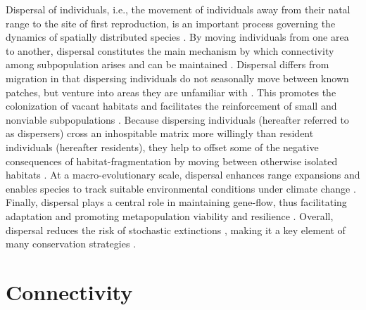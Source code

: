 \documentclass[../FinalThesis.tex]{subfiles}
\begin{document}
Dispersal of individuals, i.e., the movement of individuals away from their
natal range to the site of first reproduction, is an important process governing
the dynamics of spatially distributed species \citep{Howard.1960, Clobert.2012}.
By moving individuals from one area to another, dispersal constitutes the main
mechanism by which connectivity among subpopulation arises and can be maintained
\citep{Fahrig.2003}. Dispersal differs from migration in that dispersing
individuals do not seasonally move between known patches, but venture into areas
they are unfamiliar with \citep{Hundertmark.2007}. This promotes the
colonization of vacant habitats \citep{Gustafson.1996, Hanski.1999,
MacArthur.2001} and facilitates the reinforcement of small and nonviable
subpopulations \citep{Brown.1977}. Because dispersing individuals (hereafter
referred to as dispersers) cross an inhospitable matrix more willingly than
resident individuals (hereafter residents), they help to offset some of the
negative consequences of habitat-fragmentation by moving between otherwise
isolated habitats \citep{Marsh.2004, Elliot.2014}. At a macro-evolutionary
scale, dispersal enhances range expansions and enables species to track suitable
environmental conditions under climate change \citep{Kokko.2006, Hodgson.2012,
Hodgson.2016}. Finally, dispersal plays a central role in maintaining gene-flow,
thus facilitating adaptation and promoting metapopulation viability and
resilience \citep{Brachet.1999, Marsh.2004, Heinz.2006}. Overall, dispersal
reduces the risk of stochastic extinctions \citep{Shaffer.1985, Melbourne.2008},
making it a key element of many conservation strategies \citep{Baguette.2013}.

\section{Connectivity}
\end{document}

